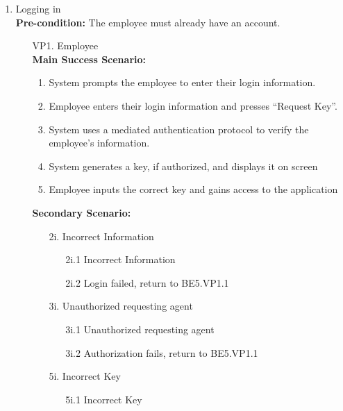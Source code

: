 \documentclass[]{article}
\begin{document}
\begin{enumerate}[{\bf BE1.}]
\begin{enumerate}[{\bf BE5.}]
    \item Logging in \\ 
        \textbf{Pre-condition:} The employee must already have an account. 
        \begin{enumerate}
            \item[VP1.] Employee \\
                \textbf{Main Success Scenario:}
                \begin{enumerate}
                    \item System prompts the employee to enter their login information.  
                    \item Employee enters their login information and presses “Request Key”.  
                    \item System uses a mediated authentication protocol to verify the employee’s information. 
                    \item System generates a key, if authorized, and displays it on screen 
                    \item Employee inputs the correct key and gains access to the application 
                \end{enumerate}
                \textbf{Secondary Scenario:}
                \begin{enumerate}
                    \item[2i.] Incorrect Information
                    \begin{enumerate}
                        \item[2i.1] Incorrect Information
                        \item[2i.2] Login failed, return to BE5.VP1.1
                    \end{enumerate}
                    \item[3i.] Unauthorized requesting agent
                    \begin{enumerate}
                        \item[3i.1] Unauthorized requesting agent
                        \item[3i.2] Authorization fails, return to BE5.VP1.1
                    \end{enumerate}
                    \item[5i.] Incorrect Key
                    \begin{enumerate}
                        \item[5i.1] Incorrect Key

\end{enumerate}
\end{enumerate}
\end{enumerate}
\end{enumerate}
\end{enumerate}
\end{document}
